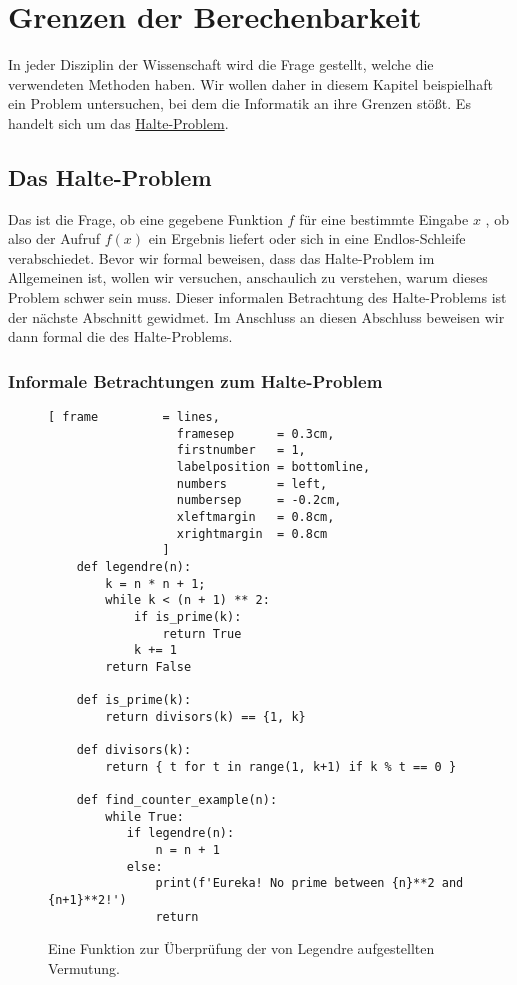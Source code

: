 \chapter{Grenzen der Berechenbarkeit}
In jeder Disziplin der Wissenschaft wird die Frage gestellt, welche  die
verwendeten Methoden haben.   Wir wollen daher in diesem Kapitel beispielhaft ein Problem
untersuchen, bei dem die Informatik an ihre Grenzen stößt.  Es handelt sich um das
\href{http://de.wikipedia.org/wiki/Halteproblem}{Halte-Problem}.  

\section{Das Halte-Problem}
Das  ist die Frage, ob eine gegebene Funktion $f$ für eine bestimmte Eingabe $x$ 
, ob also der Aufruf $f(x)$ ein Ergebnis liefert oder sich in eine Endlos-Schleife
verabschiedet.   Bevor wir formal beweisen, dass das Halte-Problem im Allgemeinen  ist, wollen 
wir versuchen, anschaulich zu verstehen, warum dieses Problem schwer sein muss.  Dieser informalen
Betrachtung des Halte-Problems ist der nächste Abschnitt gewidmet.  Im Anschluss an diesen Abschluss
beweisen wir dann formal die  des Halte-Problems. 

\subsection{Informale Betrachtungen zum Halte-Problem}


\begin{figure}[!ht]
\centering
\begin{Verbatim}[ frame         = lines, 
                  framesep      = 0.3cm, 
                  firstnumber   = 1,
                  labelposition = bottomline,
                  numbers       = left,
                  numbersep     = -0.2cm,
                  xleftmargin   = 0.8cm,
                  xrightmargin  = 0.8cm
                ]
    def legendre(n):
        k = n * n + 1;
        while k < (n + 1) ** 2:
            if is_prime(k):
                return True
            k += 1
        return False
    
    def is_prime(k):
        return divisors(k) == {1, k}    
    
    def divisors(k):
        return { t for t in range(1, k+1) if k % t == 0 }
    
    def find_counter_example(n):
        while True:
           if legendre(n):
               n = n + 1
           else:
               print(f'Eureka! No prime between {n}**2 and {n+1}**2!')
               return
\end{Verbatim} 
\vspace*{-0.3cm}
\caption{Eine Funktion zur Überprüfung der von Legendre aufgestellten Vermutung.}
\label{fig:legendre.stlx}
\end{figure}

